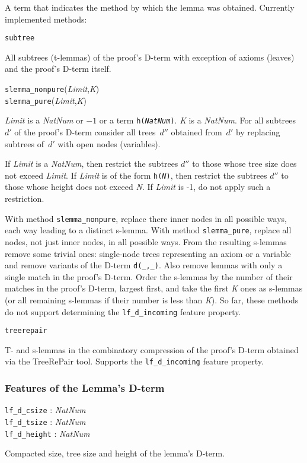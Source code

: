 \documentclass[a4paper,11pt]{article}
\newcommand{\f}[1]{\texttt{#1}}
\newcommand{\var}[1]{\textnormal{\textit{#1}}}
\newcommand{\lit}[1]{\textnormal{\textit{#1}}}
\newcommand{\propsig}[2]
{\noindent \f{#1} : #2}
\newcommand{\propdesc}[1]
{\par \hspace*{\fill}\begin{minipage}{0.9\textwidth}#1\end{minipage}\par\smallskip}
\begin{document}
\propdesc{A term that indicates the method by which the lemma was obtained.
  Currently implemented methods:

  \medskip
  \f{subtree}

  All subtrees (t-lemmas) of the proof's D-term with exception of axioms
  (leaves) and the proof's D-term itself.

  \medskip
  \f{slemma\_nonpure}(\var{Limit},\var{K})\\
  \f{slemma\_pure}(\var{Limit},\var{K})


  \var{Limit} is a \lit{NatNum} or $-1$ or a term \f{h(\lit{NatNum})}. \var{K}
  is a \lit{NatNum}. For all subtrees~$d'$ of the proof's D-term consider all
  trees~$d''$ obtained from~$d'$ by replacing subtrees of~$d'$ with open nodes
  (variables).

  If \lit{Limit} is a \lit{NatNum}, then restrict the subtrees $d''$ to those
  whose tree size does not exceed \var{Limit}. If \lit{Limit} is of the form
  \f{h(\lit{N})}, then restrict the subtrees $d''$ to those whose height does
  not exceed \var{N}. If \lit{Limit} is -1, do not apply such a restriction.
  
  With method \f{slemma\_nonpure}, replace there inner nodes in all possible
  ways, each way leading to a distinct s-lemma. With method \f{slemma\_pure},
  replace all nodes, not just inner nodes, in all possible ways. From the
  resulting s-lemmas remove some trivial ones: single-node trees representing
  an axiom or a variable and remove variants of the D-term \f{d(\_,\_)}. Also
  remove lemmas with only a single match in the proof's D-term. Order the
  s-lemmas by the number of their matches in the proof's D-term, largest
  first, and take the first \var{K} ones as s-lemmas (or all remaining
  s-lemmas if their number is less than \var{K}). So far, these methods do not
  support determining the \f{lf\_d\_incoming} feature property.

   \medskip
   \f{treerepair}
   
   T- and s-lemmas in the combinatory compression
   of the proof's D-term obtained via the TreeRePair tool. Supports the
   \f{lf\_d\_incoming} feature property.
}%

\subsubsection{Features of the Lemma's D-term}

\propsig{lf\_d\_csize}{\lit{NatNum}}\\
\propsig{lf\_d\_tsize}{\lit{NatNum}}\\
\propsig{lf\_d\_height}{\lit{NatNum}} \propdesc{Compacted size, tree size and
  height of the lemma's D-term.}
\end{document}
